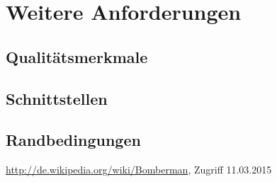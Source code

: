 \documentclass[11pt]{scrartcl}
\begin{document}
\section{Weitere Anforderungen}
\label{sec:Weitere Anforderungen}

\subsection{Qualitätsmerkmale}
\label{sec:Qualitätsmermale}

\subsection{Schnittstellen}
\label{sec:Schnittstellen}

\subsection{Randbedingungen}
\label{sec:Randbedingungen}


\begin{thebibliography}{999}
\url{http://de.wikipedia.org/wiki/Bomberman}, Zugriff 
11.03.2015
\end{thebibliography}
\end{document}
